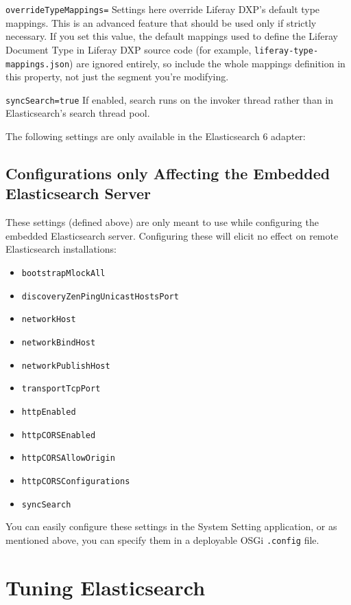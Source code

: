 \texttt{overrideTypeMappings=} Settings here override Liferay DXP's
default type mappings. This is an advanced feature that should be used
only if strictly necessary. If you set this value, the default mappings
used to define the Liferay Document Type in Liferay DXP source code (for
example, \texttt{liferay-type-mappings.json}) are ignored entirely, so
include the whole mappings definition in this property, not just the
segment you're modifying.

\texttt{syncSearch=true} If enabled, search runs on the invoker thread
rather than in Elasticsearch's search thread pool.

The following settings are only available in the Elasticsearch 6
adapter:

\subsection{Configurations only Affecting the Embedded Elasticsearch
Server}\label{configurations-only-affecting-the-embedded-elasticsearch-server}

These settings (defined above) are only meant to use while configuring
the embedded Elasticsearch server. Configuring these will elicit no
effect on remote Elasticsearch installations:

\begin{itemize}
\tightlist
\item
  \texttt{bootstrapMlockAll}
\item
  \texttt{discoveryZenPingUnicastHostsPort}
\item
  \texttt{networkHost}
\item
  \texttt{networkBindHost}
\item
  \texttt{networkPublishHost}
\item
  \texttt{transportTcpPort}
\item
  \texttt{httpEnabled}
\item
  \texttt{httpCORSEnabled}
\item
  \texttt{httpCORSAllowOrigin}
\item
  \texttt{httpCORSConfigurations}
\item
  \texttt{syncSearch}
\end{itemize}

You can easily configure these settings in the System Setting
application, or as mentioned above, you can specify them in a deployable
OSGi \texttt{.config} file.

\section{Tuning Elasticsearch}\label{tuning-elasticsearch}

